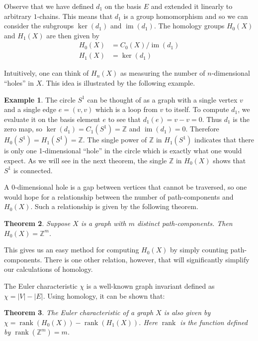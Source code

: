 \documentclass[12pt,a4paper]{amsart}
\numberwithin{equation}{section}
\def\Z{{\mathbb Z}}
\def\im{\operatorname{im}}
\def\ker{\operatorname{ker}}
\def\rank{\operatorname{rank}}
\theoremstyle{plain}
\newtheorem{Th}{Theorem}[section]
\theoremstyle{definition}
\newtheorem{Ex}[Th]{Example}
\begin{document}
Observe that we have defined $d_1$ on the basis $E$ and extended it linearly to arbitrary $1$-chains. This means that $d_1$ is a group homomorphism and so we can consider the subgroups $\ker(d_1)$ and $\im(d_1)$. The homology groups $H_0(X)$ and $H_1(X)$ are then given by
\begin{align*}
H_0(X) &= C_0(X) / \im(d_1) \\
H_1(X) &= \ker(d_1)
\end{align*}

Intuitively, one can think of $H_n(X)$ as measuring the number of $n$-dimensional ``holes'' in $X$. This idea is illustrated by the following example.

\begin{Ex} 
The circle $S^1$ can be thought of as a graph with a single vertex $v$ and a single edge $e = (v,v)$ which is a loop from $v$ to itself. To compute $d_1$, we evaluate it on the basis element $e$ to see that $d_1(e) = v-v = 0$. Thus $d_1$ is the zero map, so $\ker(d_1) = C_1(S^1) = \Z$ and $\im(d_1) = 0$. Therefore $H_0(S^1) = H_1(S^1) = \Z$. The single power of $\Z$ in $H_1(S^1)$ indicates that there is only one 1-dimensional ``hole'' in the circle which is exactly what one would expect. As we will see in the next theorem, the single $\Z$ in $H_0(X)$ shows that $S^1$ is connected.
\end{Ex}

A 0-dimensional hole is a gap between vertices that cannot be traversed, so one would hope for a relationship between the number of path-components and $H_0(X)$. Such a relationship is given by the following theorem.

\begin{Th}
Suppose $X$ is a graph with $m$ distinct path-components. Then $H_0(X) = \Z^m$.
\end{Th}

This gives us an easy method for computing $H_0(X)$ by simply counting path-components. There is one other relation, however, that will significantly simplify our calculations of homology.

The Euler characteristic $\chi$ is a well-known graph invariant defined as $\chi = |V| - |E|$. Using homology, it can be shown that:

\begin{Th}
The Euler characteristic of a graph $X$ is also given by $\chi = \rank(H_0(X)) - \rank(H_1(X))$. Here $\rank$ is the function defined by $\rank(\Z^m) = m$.
\end{Th}
\end{document}
